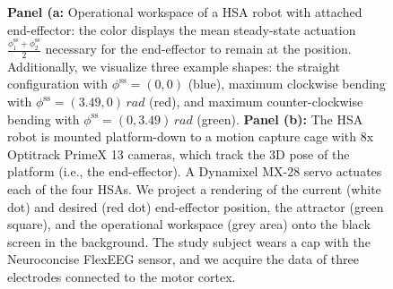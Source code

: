 \begin{figure}
\begin{center}
    \caption{\textbf{Panel (a:} Operational workspace of a HSA robot with attached end-effector: the color displays the mean steady-state actuation $\frac{\phi_1^\mathrm{ss} + \phi_2^\mathrm{ss}}{2}$ necessary for the end-effector to remain at the position. Additionally, we visualize three example shapes: the straight configuration with $\phi^\mathrm{ss} = (0, 0)$ (blue), maximum clockwise bending with $\phi^\mathrm{ss} = (3.49, 0) \, \si{rad}$ (red), and maximum counter-clockwise bending with $\phi^\mathrm{ss} = (0, 3.49) \, \si{rad}$ (green).
    \textbf{Panel (b):} The HSA robot is mounted platform-down to a motion capture cage with 8x Optitrack PrimeX 13 cameras, which track the 3D pose of the platform (i.e., the end-effector). A Dynamixel MX-28 servo actuates each of the four HSAs. We project a rendering of the current (white dot) and desired (red dot) end-effector position, the attractor (green square), and the operational workspace (grey area) onto the black screen in the background. The study subject wears a cap with the Neuroconcise FlexEEG sensor, and we acquire the data of three electrodes connected to the motor cortex.}
\end{center}
\end{figure}

